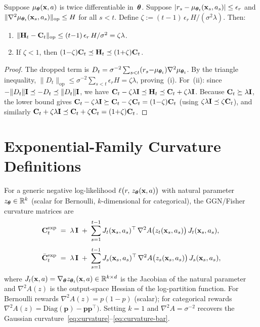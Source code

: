 \documentclass[twoside]{article}
\begin{document}
\begin{lemma}\label{lem:ggn-approx}
Suppose $\mu_{\boldsymbol{\theta}}(\mathbf{x},a)$ is twice differentiable in~$\boldsymbol{\theta}$.
Suppose $|r_s - \mu_{\boldsymbol{\theta}_t}(\mathbf{x}_s,a_s)| \le \epsilon_r$ and
$\|\nabla^2 \mu_{\boldsymbol{\theta}_t}(\mathbf{x}_s,a_s)\|_{\mathrm{op}} \le H$
for all $s < t$.
Define $\zeta := (t{-}1)\,\epsilon_r\, H / (\sigma^2 \lambda)$.
Then:
\begin{enumerate}[nosep,label=(\roman*)]
\item $\|\mathbf{H}_t - \mathbf{C}_t\|_{\mathrm{op}}
\le (t{-}1)\,\epsilon_r\, H / \sigma^2 = \zeta\lambda$.
\item If $\zeta < 1$, then
$(1{-}\zeta)\mathbf{C}_t \preceq \mathbf{H}_t \preceq (1{+}\zeta)\mathbf{C}_t$.
\end{enumerate}
\end{lemma}
\begin{proof}
The dropped term is
$D_t = \sigma^{-2}\sum_{s<t}(r_s{-}\mu_{\boldsymbol{\theta}_t})\nabla^2\mu_{\boldsymbol{\theta}_t}$.
By the triangle inequality,
$\|D_t\|_{\mathrm{op}} \le \sigma^{-2}\sum_{s<t}\epsilon_r H
= \zeta\lambda$, proving~(i).
For~(ii): since $-\|D_t\|\mathbf{I} \preceq -D_t \preceq \|D_t\|\mathbf{I}$,
we have $\mathbf{C}_t - \zeta\lambda\mathbf{I} \preceq \mathbf{H}_t \preceq \mathbf{C}_t + \zeta\lambda\mathbf{I}$.
Because $\mathbf{C}_t \succeq \lambda\mathbf{I}$, the lower bound gives
$\mathbf{C}_t - \zeta\lambda\mathbf{I} \succeq \mathbf{C}_t - \zeta\mathbf{C}_t = (1{-}\zeta)\mathbf{C}_t$
(using $\zeta\lambda\mathbf{I} \preceq \zeta\mathbf{C}_t$), and similarly
$\mathbf{C}_t + \zeta\lambda\mathbf{I} \preceq \mathbf{C}_t + \zeta\mathbf{C}_t = (1{+}\zeta)\mathbf{C}_t$.
\end{proof}

\section{Exponential-Family Curvature Definitions}\label{app:expfam}

For a generic negative log-likelihood $\ell\bigl(r,\,z_{\boldsymbol{\theta}}(\mathbf{x},a)\bigr)$
with natural parameter $z_{\boldsymbol{\theta}}\in\mathbb{R}^{k}$ (scalar for Bernoulli,
$k$-dimensional for categorical), the GGN/Fisher curvature matrices are
\begin{align}
  \mathbf{C}_t^{\mathrm{exp}}
  &\;=\;
  \lambda\,\mathbf{I}
  \;+\;
  \sum_{s=1}^{t-1}
    J_t(\mathbf{x}_s,a_s)^\top\,\nabla^2 A\bigl(z_t(\mathbf{x}_s,a_s)\bigr)\,
    J_t(\mathbf{x}_s,a_s),
  \label{eq:curvature-exp}\\[4pt]
  \bar{\mathbf{C}}_t^{\mathrm{exp}}
  &\;=\;
  \lambda\,\mathbf{I}
  \;+\;
  \sum_{s=1}^{t-1}
    J_s(\mathbf{x}_s,a_s)^\top\,\nabla^2 A\bigl(z_s(\mathbf{x}_s,a_s)\bigr)\,
    J_s(\mathbf{x}_s,a_s),
  \label{eq:curvature-bar-exp}
\end{align}
where $J_t(\mathbf{x},a)=\nabla_{\boldsymbol{\theta}}z_{\boldsymbol{\theta}_t}(\mathbf{x},a)\in\mathbb{R}^{k\times d}$
is the Jacobian of the natural parameter and
$\nabla^2 A(z)$ is the output-space Hessian of the log-partition
function.
For Bernoulli rewards $\nabla^2 A(z)=p(1{-}p)$ (scalar);
for categorical rewards $\nabla^2 A(z)=\mathrm{Diag}(\mathbf{p})
-\mathbf{p}\mathbf{p}^\top)$.
Setting $k=1$ and $\nabla^2 A=\sigma^{-2}$ recovers the
Gaussian curvature~\eqref{eq:curvature}--\eqref{eq:curvature-bar}.
\end{document}
